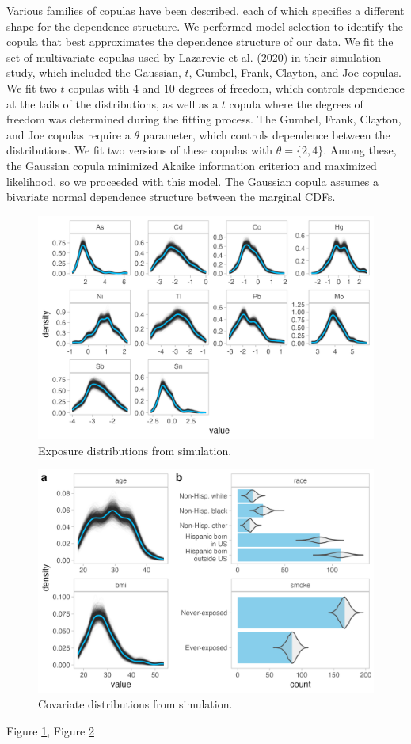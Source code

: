 \documentclass[12pt, twoside]{amherstthesis}
\begin{document}
Various families of copulas have been described, each of which specifies a different shape for the dependence structure. We performed model selection to identify the copula that best approximates the dependence structure of our data. We fit the set of multivariate copulas used by Lazarevic et al. (2020) in their simulation study, which included the Gaussian, \(t\), Gumbel, Frank, Clayton, and Joe copulas. We fit two \(t\) copulas with 4 and 10 degrees of freedom, which controls dependence at the tails of the distributions, as well as a \(t\) copula where the degrees of freedom was determined during the fitting process. The Gumbel, Frank, Clayton, and Joe copulas require a \(\theta\) parameter, which controls dependence between the distributions. We fit two versions of these copulas with \(\theta=\{2, 4\}\). Among these, the Gaussian copula minimized Akaike information criterion and maximized likelihood, so we proceeded with this model. The Gaussian copula assumes a bivariate normal dependence structure between the marginal CDFs.
\begin{figure}

{\centering \includegraphics[width=0.75\linewidth]{figures/ch4_univ_exp_sim} 

}

\caption{Exposure distributions from simulation.}\label{fig:univexpsim}
\end{figure}
\begin{figure}

{\centering \includegraphics[width=0.75\linewidth]{figures/ch4_univ_cov_sim} 

}

\caption{Covariate distributions from simulation.}\label{fig:univcovsim}
\end{figure}
Figure \ref{fig:univexpsim}, Figure \ref{fig:univcovsim}
\end{document}
